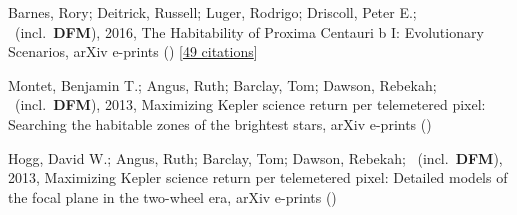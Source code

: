 \item[{\color{numcolor}\scriptsize3}] Barnes, Rory; Deitrick, Russell; Luger, Rodrigo; Driscoll, Peter E.; \etal\ (incl.\ \textbf{DFM}), 2016, The Habitability of Proxima Centauri b I: Evolutionary Scenarios, arXiv e-prints () [\href{https://ui.adsabs.harvard.edu/abs/2016arXiv160806919B}{49 citations}]

\item[{\color{numcolor}\scriptsize2}] Montet, Benjamin T.; Angus, Ruth; Barclay, Tom; Dawson, Rebekah; \etal\ (incl.\ \textbf{DFM}), 2013, Maximizing Kepler science return per telemetered pixel: Searching the habitable zones of the brightest stars, arXiv e-prints ()

\item[{\color{numcolor}\scriptsize1}] Hogg, David W.; Angus, Ruth; Barclay, Tom; Dawson, Rebekah; \etal\ (incl.\ \textbf{DFM}), 2013, Maximizing Kepler science return per telemetered pixel: Detailed models of the focal plane in the two-wheel era, arXiv e-prints ()